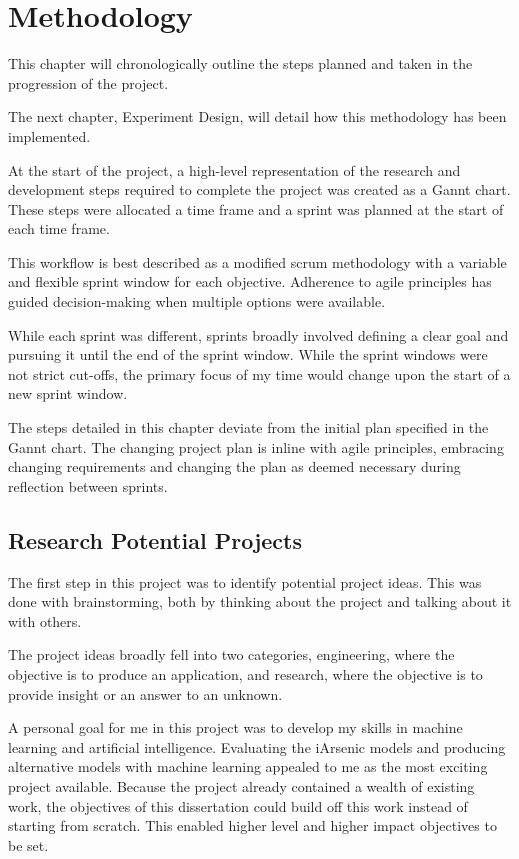 \chapter{Methodology}

This chapter will chronologically outline the steps planned and taken in the progression of the project.

The next chapter, Experiment Design, will detail how this methodology has been implemented.

At the start of the project, a high-level representation of the research and development steps required to complete the project was created as a Gannt chart. These steps were allocated a time frame and a sprint was planned at the start of each time frame.

This workflow is best described as a modified scrum methodology with a variable and flexible sprint window for each objective. Adherence to agile principles has guided decision-making when multiple options were available.

While each sprint was different, sprints broadly involved defining a clear goal and pursuing it until the end of the sprint window. While the sprint windows were not strict cut-offs, the primary focus of my time would change upon the start of a new sprint window.

The steps detailed in this chapter deviate from the initial plan specified in the Gannt chart. The changing project plan is inline with agile principles, embracing changing requirements and changing the plan as deemed necessary during reflection between sprints.

\section{Research Potential Projects}

The first step in this project was to identify potential project ideas. This was done with brainstorming, both by thinking about the project and talking about it with others.

The project ideas broadly fell into two categories, engineering, where the objective is to produce an application, and research, where the objective is to provide insight or an answer to an unknown.

A personal goal for me in this project was to develop my skills in machine learning and artificial intelligence. Evaluating the iArsenic models and producing alternative models with machine learning appealed to me as the most exciting project available. Because the project already contained a wealth of existing work, the objectives of this dissertation could build off this work instead of starting from scratch. This enabled higher level and higher impact objectives to be set. 

